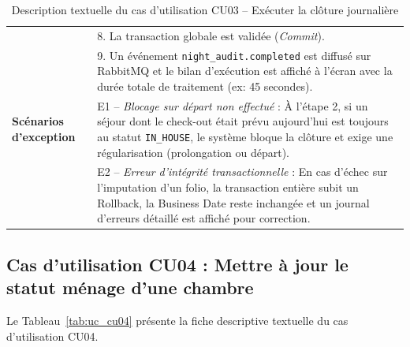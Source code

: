 \begin{table}[H]
\begin{tabularx}{\textwidth}{|p{3.5cm}|X|}
& 8. La transaction globale est validée (\textit{Commit}).\\
& 9. Un événement \texttt{night\_audit.completed} est diffusé sur RabbitMQ et le bilan d'exécution est affiché à l'écran avec la durée totale de traitement (ex: 45 secondes).\\
\hline
\textbf{Scénarios d'exception} & 
E1 -- \textit{Blocage sur départ non effectué} : À l'étape 2, si un séjour dont le check-out était prévu aujourd'hui est toujours au statut \texttt{IN\_HOUSE}, le système bloque la clôture et exige une régularisation (prolongation ou départ).\\
& E2 -- \textit{Erreur d'intégrité transactionnelle} : En cas d'échec sur l'imputation d'un folio, la transaction entière subit un Rollback, la Business Date reste inchangée et un journal d'erreurs détaillé est affiché pour correction.\\
\hline
\end{tabularx}
\caption{Description textuelle du cas d'utilisation CU03 -- Exécuter la clôture journalière}
\label{tab:uc_cu03}
\end{table}

\subsection{Cas d'utilisation CU04 : Mettre à jour le statut ménage d'une chambre}

Le Tableau~\ref{tab:uc_cu04} présente la fiche descriptive textuelle du cas d'utilisation CU04.

